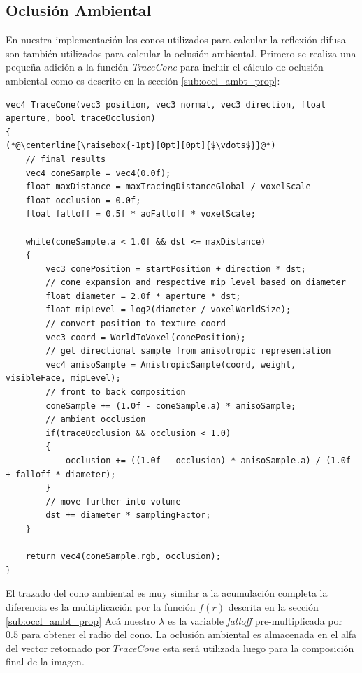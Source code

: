 \subsection{Oclusión Ambiental} %
\label{sub:oclusion_ambient}
En nuestra implementación los conos utilizados para calcular la reflexión difusa son también utilizados para calcular la oclusión ambiental. Primero se realiza una pequeña adición a la función \emph{TraceCone} para incluir el cálculo de oclusión ambiental como es descrito en la sección \ref{sub:occl_ambt_prop}:
\\
\begin{lstlisting}[caption={Oclusión ambiental para el algoritmo de trazado de conos.}, label=Trace5]
vec4 TraceCone(vec3 position, vec3 normal, vec3 direction, float aperture, bool traceOcclusion)
{
(*@\centerline{\raisebox{-1pt}[0pt][0pt]{$\vdots$}}@*)
    // final results
    vec4 coneSample = vec4(0.0f);
    float maxDistance = maxTracingDistanceGlobal / voxelScale
    float occlusion = 0.0f;
    float falloff = 0.5f * aoFalloff * voxelScale;

    while(coneSample.a < 1.0f && dst <= maxDistance)
    {
        vec3 conePosition = startPosition + direction * dst;
        // cone expansion and respective mip level based on diameter
        float diameter = 2.0f * aperture * dst;
        float mipLevel = log2(diameter / voxelWorldSize);
        // convert position to texture coord
        vec3 coord = WorldToVoxel(conePosition);
        // get directional sample from anisotropic representation
        vec4 anisoSample = AnistropicSample(coord, weight, visibleFace, mipLevel);
        // front to back composition
        coneSample += (1.0f - coneSample.a) * anisoSample;
        // ambient occlusion
        if(traceOcclusion && occlusion < 1.0)
        {
            occlusion += ((1.0f - occlusion) * anisoSample.a) / (1.0f + falloff * diameter);
        }
        // move further into volume
        dst += diameter * samplingFactor;
    }

    return vec4(coneSample.rgb, occlusion);
}
\end{lstlisting}
El trazado del cono ambiental es muy similar a la acumulación completa la diferencia es la multiplicación por la función $f(r)$ descrita en la sección \ref{sub:occl_ambt_prop} Acá nuestro $\lambda$ es la variable \emph{falloff} pre-multiplicada por $0.5$ para obtener el radio del cono. La oclusión ambiental es almacenada en el alfa del vector retornado por $TraceCone$ esta será utilizada luego para la composición final de la imagen.

